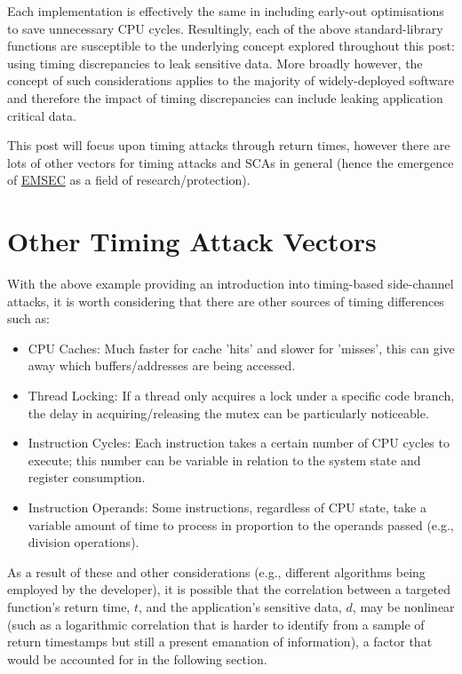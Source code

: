 Each implementation is effectively the same in including early-out optimisations to save unnecessary CPU cycles. Resultingly, each of the above
			standard-library functions are susceptible to the underlying concept explored throughout this post: using timing discrepancies to leak sensitive data.
			More broadly however, the concept of such considerations applies to the majority of widely-deployed software and therefore the impact of timing
			discrepancies can include leaking application critical
			data.

This post will focus upon timing attacks through return times, however there are lots of other vectors for timing attacks and
			SCAs in general (hence the emergence of \href{https://csrc.nist.gov/glossary/term/emission_security}{EMSEC}
			as a field of research/protection).
		

\section{Other Timing Attack Vectors}
		
			With the above example providing an introduction into timing-based side-channel attacks, it is worth considering that there are other sources
			of timing differences such as:
		
		
\begin{itemize}
\item CPU Caches: Much faster for cache 'hits' and slower for 'misses', this can give away which buffers/addresses are being accessed.
\item Thread Locking: If a thread only acquires a lock under a specific code branch, the delay in acquiring/releasing the mutex can be particularly noticeable.
\item Instruction Cycles: Each instruction takes a certain number of CPU cycles to execute; this number can be variable in relation to the system state and register consumption.
\item Instruction Operands: Some instructions, regardless of CPU state, take a variable amount of time to process in proportion to the operands passed (e.g., division operations).
\end{itemize}
		
		
			As a result of these and other considerations (e.g., different algorithms being employed by the developer), it is possible that
			the correlation between a targeted function's return time, \emph{$t$}, and the application's sensitive data, \emph{$d$}, may be nonlinear (such as a logarithmic correlation that is harder to
			identify from a sample of return timestamps but still a present emanation of information), a factor that would be accounted for
			in the following section.
		

